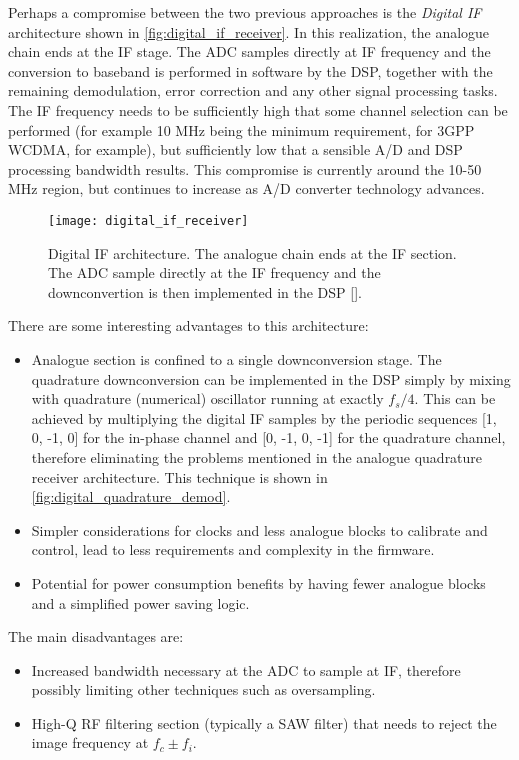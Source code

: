 Perhaps a compromise between the two previous approaches is the \emph{Digital IF } architecture shown in \autoref{fig:digital_if_receiver}. In this realization, the analogue chain ends at the IF stage. The ADC samples directly at IF frequency and the conversion to baseband is performed in software by the DSP, together with the remaining demodulation, error correction and any other signal processing tasks. The IF frequency needs to be sufficiently high that some channel selection can be performed (for example 10 MHz being the minimum requirement, for 3GPP WCDMA, for example), but sufficiently low that a sensible A/D and DSP processing bandwidth results. This compromise is currently around the 10-50 MHz region, but continues to increase as A/D converter technology advances.

\begin{figure}[H]
  \centering
  \texttt{[image: digital\_if\_receiver]}
  \caption[Digital IF architecture]{Digital IF architecture. The analogue chain ends at the IF section. The ADC sample directly at the IF frequency and the downconvertion is then implemented in the DSP [\citeauthor{rf_bb_techniques_sdr}].}
  \label{fig:digital_if_receiver}
\end{figure}

There are some interesting advantages to this architecture:
\begin{itemize}
  \item Analogue section is confined to a single downconversion stage. The quadrature downconversion can be implemented in the DSP simply by mixing with quadrature (numerical) oscillator running at exactly $f_s/4$. This can be achieved by multiplying the digital IF samples by the periodic sequences [1, 0, -1, 0] for the in-phase channel and [0, -1, 0, -1] for the quadrature channel, therefore eliminating the problems mentioned in the analogue quadrature receiver architecture. This technique is shown in \autoref{fig:digital_quadrature_demod}.
  \item Simpler considerations for clocks and less analogue blocks to calibrate and control, lead to less requirements and complexity in the firmware.
  \item Potential for power consumption benefits  by having fewer analogue blocks and a simplified power saving logic.
\end{itemize}

The main disadvantages are:
\begin{itemize}
  \item Increased bandwidth necessary at the ADC to sample at IF, therefore possibly limiting other techniques such as oversampling.
  \item High-Q RF filtering section (typically a SAW filter) that needs to reject the image frequency at $f_c \pm f_i$.
\end{itemize}

